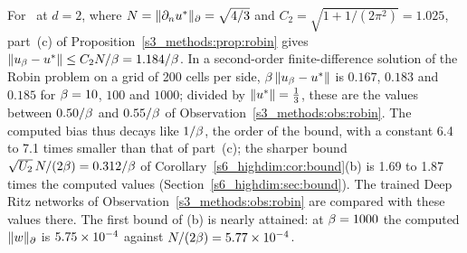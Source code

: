 \begin{observation}\label{sA_proofs:obs:sharp}
For \Pone\ at $d=2$, where $N=\lVert \partial_nu^{*}\rVert_{\partial}=\sqrt{4/3}$ and
$C_2=\sqrt{1+1/(2\pi^2)}=1.025$, part~(c) of Proposition~\ref{s3_methods:prop:robin} gives
$\lVert u_{\beta}-u^{*}\rVert\le C_2N/\beta=1.184/\beta$. In a second-order finite-difference
solution of the Robin problem on a grid of 200 cells per side, $\beta\,\lVert u_{\beta}-u^{*}\rVert$
is $0.167$, $0.183$ and $0.185$ for $\beta=10$, $100$ and $1000$; divided by
$\lVert u^{*}\rVert=\tfrac13$, these are the values between $0.50/\beta$ and $0.55/\beta$ of
Observation~\ref{s3_methods:obs:robin}. The computed bias thus decays like $1/\beta$, the
order of the bound, with a constant 6.4 to 7.1 times smaller than that of part~(c); the sharper
bound $\sqrt{U_2}\,N/(2\beta)=0.312/\beta$ of Corollary~\ref{s6_highdim:cor:bound}(b) is 1.69 to 1.87
times the computed values (Section~\ref{s6_highdim:sec:bound}).
The
trained Deep Ritz networks of Observation~\ref{s3_methods:obs:robin} are compared with
these values there. The first bound of (b) is nearly attained: at $\beta=1000$ the computed $\lVert w\rVert_{\partial}$ is
$5.75\times 10^{-4}$ against $N/(2\beta)=5.77\times 10^{-4}$.
\end{observation}

